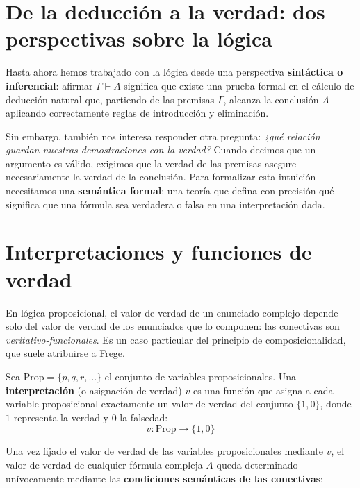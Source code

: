 \section{De la deducción a la verdad: dos perspectivas sobre la lógica}

Hasta ahora hemos trabajado con la lógica desde una perspectiva
\textbf{sintáctica o inferencial}: afirmar 
$\Gamma \vdash A$ significa que existe una prueba formal en el cálculo
de deducción natural que, partiendo de las premisas $\Gamma$, alcanza
la conclusión $A$ aplicando correctamente reglas de introducción y
eliminación. 

Sin embargo, también nos interesa responder otra pregunta: 
\emph{¿qué relación guardan nuestras demostraciones con la verdad?}
Cuando decimos que un argumento es válido, exigimos que la verdad de
las premisas asegure necesariamente la verdad de la conclusión. Para formalizar esta intuición necesitamos una \textbf{semántica formal}: una teoría que defina con precisión qué significa que una fórmula sea verdadera o falsa en una interpretación dada.

\section{Interpretaciones y funciones de verdad}

En lógica proposicional, el valor de verdad de un enunciado complejo
depende solo del valor de verdad de los enunciados que lo componen: las conectivas son \emph{veritativo-funcionales}. Es un caso particular del principio de composicionalidad, que suele atribuirse a Frege.

\begin{definition}
Sea $\text{Prop} = \{p, q, r, \dots\}$ el conjunto de variables proposicionales. Una \textbf{interpretación} (o asignación de verdad) $v$ es una función que asigna a cada variable proposicional exactamente un valor de verdad del conjunto $\{1, 0\}$, donde $1$ representa la verdad y $0$ la falsedad:
\[
v: \text{Prop} \to \{1, 0\}
\]
\end{definition}

Una vez fijado el valor de verdad de las variables proposicionales mediante $v$, el valor de verdad de cualquier fórmula compleja $A$ queda determinado unívocamente mediante las \textbf{condiciones semánticas de las conectivas}:

